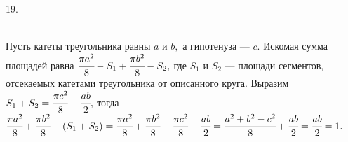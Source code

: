 19. \begin{figure}[ht!]
\end{figure}\\
Пусть катеты треугольника равны $a$ и $b,$ а гипотенуза --- $c.$ Искомая сумма площадей равна $\cfrac{\pi a^2}{8}-S_1+\cfrac{\pi b^2}{8}-S_2,$ где $S_1$ и $S_2$ --- площади сегментов, отсекаемых катетами треугольника от описанного круга. Выразим $S_1+S_2=\cfrac{\pi c^2}{8}-\cfrac{ab}{2},$ тогда
$\cfrac{\pi a^2}{8}+\cfrac{\pi b^2}{8}-(S_1+S_2)=\cfrac{\pi a^2}{8}+\cfrac{\pi b^2}{8}-\cfrac{\pi c^2}{8}+\cfrac{ab}{2}=\cfrac{a^2+b^2-c^2}{8}+\cfrac{ab}{2}=
\cfrac{ab}{2}=1.$\newpage\noindent
